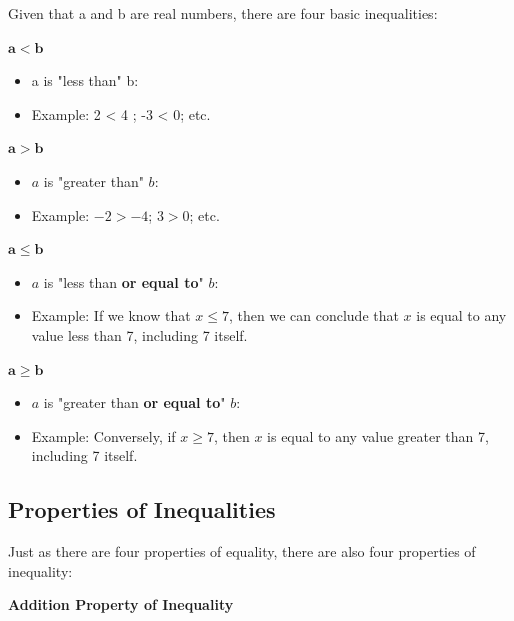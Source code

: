 Given that a and b are real numbers, there are four basic inequalities:



$\mathbf{a < b}$

\begin{itemize}
    \item a is "less than" b:
    \item Example: 2 < 4 ; -3 < 0; etc.
\end{itemize}

$\mathbf{a > b}$

\begin{itemize}
    \item $a$ is "greater than" $b$:
    \item Example: $-2 > -4$; $3 > 0$; etc.
\end{itemize}

$\mathbf{a \leq b}$

\begin{itemize}
    \item $a$ is "less than \textbf{or equal to}" $b$:
    \item Example: If we know that $x \leq 7$, then we can conclude that $x$ is equal to any value less than 7, including 7 itself.
\end{itemize}

$\mathbf{a \geq b}$

\begin{itemize}
    \item $a$ is "greater than \textbf{or equal to}" $b$:
    \item Example: Conversely, if $x \geq 7$, then $x$ is equal to any value greater than 7, including 7 itself.
\end{itemize}




\subsection{Properties of Inequalities}
\label{sss:prop-1feb}




Just as there are four properties of equality, there are also four properties of inequality:



\textbf{Addition Property of Inequality}




